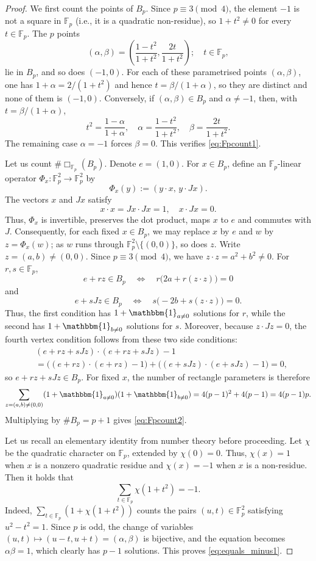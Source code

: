 \documentclass[10pt,a4paper]{amsart}
\numberwithin{equation}{section}
\begin{document}
\begin{proof}
We first count the points of $B_p$. Since $p\equiv3\pmod4$, the element $-1$ is not a square in $\mathbb{F}_p$ (i.e., it is a quadratic non-residue), so $1+t^2\ne0$ for every $t\in\mathbb{F}_p$. The $p$ points
\[ (\alpha,\beta) = \left(\frac{1-t^2}{1+t^2},\frac{2t}{1+t^2}\right); \quad t\in\mathbb{F}_p, \]
lie in $B_p$, and so does $(-1,0)$. For each of these parametrised points $(\alpha,\beta)$, one has $1+\alpha=2/(1+t^2)$ and hence $t=\beta/(1+\alpha)$, so they are distinct and none of them is $(-1,0)$. Conversely, if $(\alpha,\beta)\in B_p$ and $\alpha\ne-1$, then, with $t=\beta/(1+\alpha)$,
\[ t^2=\frac{1-\alpha}{1+\alpha},\quad \alpha=\frac{1-t^2}{1+t^2},\quad \beta=\frac{2t}{1+t^2}. \]
The remaining case $\alpha=-1$ forces $\beta=0$. This verifies \eqref{eq:Fpcount1}.

Let us count $\#\Box_{\mathbb{F}_p}(B_p)$. Denote $e=(1,0)$. For $x\in B_p$, define an $\mathbb{F}_p$-linear operator $\Phi_x\colon\mathbb{F}_p^2\to\mathbb{F}_p^2$ by
\[ \Phi_x(y):=(y\cdot x,\,y\cdot Jx). \]
The vectors $x$ and $Jx$ satisfy
\[ x\cdot x=Jx\cdot Jx=1, \quad x\cdot Jx=0. \]
Thus, $\Phi_x$ is invertible, preserves the dot product, maps $x$ to $e$ and commutes with $J$. Consequently, for each fixed $x\in B_p$, we may replace $x$ by $e$ and $w$ by $z=\Phi_x(w)$; as $w$ runs through $\mathbb{F}_p^2\setminus\{(0,0)\}$, so does $z$.
Write $z=(a,b)\neq(0,0)$. Since $p\equiv3\pmod4$, we have $z\cdot z=a^2+b^2\ne0$. For $r,s\in\mathbb{F}_p$,
\[ e+rz\in B_p \quad\Longleftrightarrow\quad r\bigl(2a+r(z\cdot z)\bigr)=0 \]
and
\[ e+sJz\in B_p \quad\Longleftrightarrow\quad s\bigl(-2b+s(z\cdot z)\bigr)=0. \]
Thus, the first condition has $1+\mathbbm{1}_{a\ne0}$ solutions for $r$, while the second has $1+\mathbbm{1}_{b\ne0}$ solutions for $s$. Moreover, because $z\cdot Jz=0$, the fourth vertex condition follows from these two side conditions:
\begin{align*} 
& (e+rz+sJz)\cdot(e+rz+sJz)-1 \\
& = \bigl((e+rz)\cdot(e+rz)-1\bigr) + \bigl((e+sJz)\cdot(e+sJz)-1\bigr) = 0,
\end{align*}
so $e+rz+sJz\in B_p$.
For fixed $x$, the number of rectangle parameters is therefore
\[ \sum_{z=(a,b)\neq(0,0)} (1+\mathbbm{1}_{a\ne0})(1+\mathbbm{1}_{b\ne0}) =4(p-1)^2+4(p-1)=4(p-1)p. \]
Multiplying by $\#B_p=p+1$ gives \eqref{eq:Fpcount2}.

Let us recall an elementary identity from number theory before proceeding. Let $\chi$ be the quadratic character on $\mathbb{F}_p$, extended by $\chi(0)=0$. Thus, $\chi(x)=1$ when $x$ is a nonzero quadratic residue and $\chi(x)=-1$ when $x$ is a non-residue. Then it holds that
\begin{equation}\label{eq:equals_minus1} 
\sum_{t\in\mathbb{F}_p}\chi(1+t^2)=-1. 
\end{equation}
Indeed, $\sum_{t\in\mathbb{F}_p}(1+\chi(1+t^2))$ counts the pairs $(u,t)\in\mathbb{F}_p^2$ satisfying $u^2-t^2=1$. Since $p$ is odd, the change of variables $(u,t)\mapsto(u-t,u+t)=(\alpha,\beta)$ is bijective, and the equation becomes $\alpha \beta=1$, which clearly has $p-1$ solutions. This proves \eqref{eq:equals_minus1}.


\end{proof}
\end{document}
